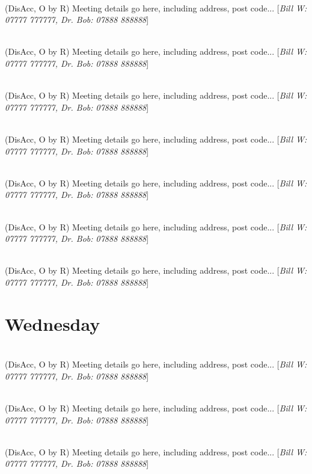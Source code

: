 \documentclass[a4paper]{article}
\newcommand{\mtgname}[1] {\vspace{0.1cm}{\bf #1}\\}   %
\newcommand{\mtgtime}[1] {\hspace{-0.2cm}{\small #1}} %
\newcommand{\mtgdetails}[1] {#1}                      %
\newcommand{\mtgphones}[1] {[\textit{#1}]}            %
\begin{document}
\mtgname{Meeting name goes here}
\mtgtime{12:45--13:45} \mtgdetails{(DisAcc, O by R) Meeting details go here, including address, post code...}
\mtgphones{Bill W: 07777 777777, Dr. Bob: 07888 888888}

\mtgname{Meeting name goes here}
\mtgtime{12:45--13:45} \mtgdetails{(DisAcc, O by R) Meeting details go here, including address, post code...}
\mtgphones{Bill W: 07777 777777, Dr. Bob: 07888 888888}

\mtgname{Meeting name goes here}
\mtgtime{12:45--13:45} \mtgdetails{(DisAcc, O by R) Meeting details go here, including address, post code...}
\mtgphones{Bill W: 07777 777777, Dr. Bob: 07888 888888}

\mtgname{Meeting name goes here}
\mtgtime{12:45--13:45} \mtgdetails{(DisAcc, O by R) Meeting details go here, including address, post code...}
\mtgphones{Bill W: 07777 777777, Dr. Bob: 07888 888888}

\mtgname{Meeting name goes here}
\mtgtime{12:45--13:45} \mtgdetails{(DisAcc, O by R) Meeting details go here, including address, post code...}
\mtgphones{Bill W: 07777 777777, Dr. Bob: 07888 888888}

\mtgname{Meeting name goes here}
\mtgtime{12:45--13:45} \mtgdetails{(DisAcc, O by R) Meeting details go here, including address, post code...}
\mtgphones{Bill W: 07777 777777, Dr. Bob: 07888 888888}

\mtgname{Meeting name goes here}
\mtgtime{12:45--13:45} \mtgdetails{(DisAcc, O by R) Meeting details go here, including address, post code...}
\mtgphones{Bill W: 07777 777777, Dr. Bob: 07888 888888}

\section*{Wednesday}

\mtgname{Meeting name goes here}
\mtgtime{12:45--13:45} \mtgdetails{(DisAcc, O by R) Meeting details go here, including address, post code...}
\mtgphones{Bill W: 07777 777777, Dr. Bob: 07888 888888}

\mtgname{Meeting name goes here}
\mtgtime{12:45--13:45} \mtgdetails{(DisAcc, O by R) Meeting details go here, including address, post code...}
\mtgphones{Bill W: 07777 777777, Dr. Bob: 07888 888888}

\mtgname{Meeting name goes here}
\mtgtime{12:45--13:45} \mtgdetails{(DisAcc, O by R) Meeting details go here, including address, post code...}
\mtgphones{Bill W: 07777 777777, Dr. Bob: 07888 888888}
\end{document}
